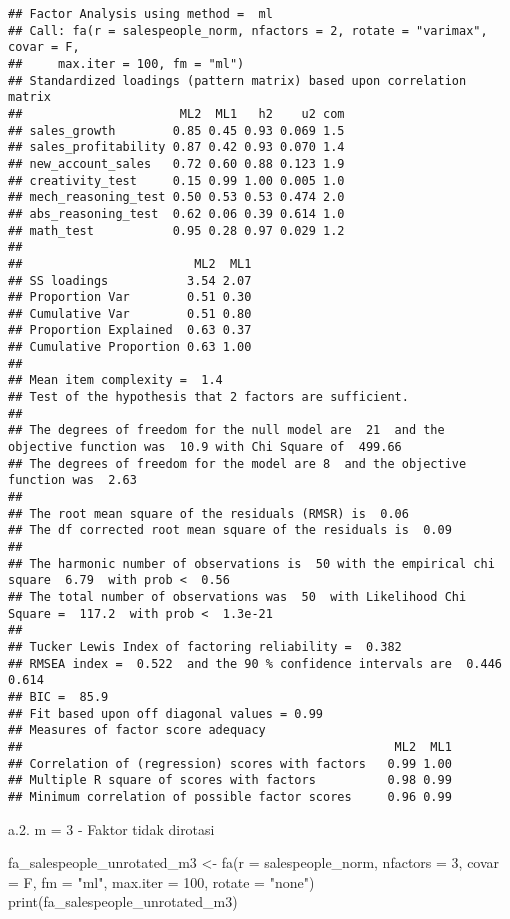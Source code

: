 \documentclass[
]{article}
\newenvironment{Shaded}{\begin{snugshade}}{\end{snugshade}}
\newcommand{\AttributeTok}[1]{\textcolor[rgb]{0.77,0.63,0.00}{#1}}
\newcommand{\DecValTok}[1]{\textcolor[rgb]{0.00,0.00,0.81}{#1}}
\newcommand{\FunctionTok}[1]{\textcolor[rgb]{0.00,0.00,0.00}{#1}}
\newcommand{\NormalTok}[1]{#1}
\newcommand{\OtherTok}[1]{\textcolor[rgb]{0.56,0.35,0.01}{#1}}
\newcommand{\StringTok}[1]{\textcolor[rgb]{0.31,0.60,0.02}{#1}}
\begin{document}
\begin{verbatim}
## Factor Analysis using method =  ml
## Call: fa(r = salespeople_norm, nfactors = 2, rotate = "varimax", covar = F, 
##     max.iter = 100, fm = "ml")
## Standardized loadings (pattern matrix) based upon correlation matrix
##                      ML2  ML1   h2    u2 com
## sales_growth        0.85 0.45 0.93 0.069 1.5
## sales_profitability 0.87 0.42 0.93 0.070 1.4
## new_account_sales   0.72 0.60 0.88 0.123 1.9
## creativity_test     0.15 0.99 1.00 0.005 1.0
## mech_reasoning_test 0.50 0.53 0.53 0.474 2.0
## abs_reasoning_test  0.62 0.06 0.39 0.614 1.0
## math_test           0.95 0.28 0.97 0.029 1.2
## 
##                        ML2  ML1
## SS loadings           3.54 2.07
## Proportion Var        0.51 0.30
## Cumulative Var        0.51 0.80
## Proportion Explained  0.63 0.37
## Cumulative Proportion 0.63 1.00
## 
## Mean item complexity =  1.4
## Test of the hypothesis that 2 factors are sufficient.
## 
## The degrees of freedom for the null model are  21  and the objective function was  10.9 with Chi Square of  499.66
## The degrees of freedom for the model are 8  and the objective function was  2.63 
## 
## The root mean square of the residuals (RMSR) is  0.06 
## The df corrected root mean square of the residuals is  0.09 
## 
## The harmonic number of observations is  50 with the empirical chi square  6.79  with prob <  0.56 
## The total number of observations was  50  with Likelihood Chi Square =  117.2  with prob <  1.3e-21 
## 
## Tucker Lewis Index of factoring reliability =  0.382
## RMSEA index =  0.522  and the 90 % confidence intervals are  0.446 0.614
## BIC =  85.9
## Fit based upon off diagonal values = 0.99
## Measures of factor score adequacy             
##                                                    ML2  ML1
## Correlation of (regression) scores with factors   0.99 1.00
## Multiple R square of scores with factors          0.98 0.99
## Minimum correlation of possible factor scores     0.96 0.99
\end{verbatim}

a.2. m = 3 - Faktor tidak dirotasi

\begin{Shaded}
\begin{Highlighting}[]
\NormalTok{fa\_salespeople\_unrotated\_m3 }\OtherTok{\textless{}{-}} \FunctionTok{fa}\NormalTok{(}\AttributeTok{r =}\NormalTok{ salespeople\_norm, }\AttributeTok{nfactors =} \DecValTok{3}\NormalTok{, }\AttributeTok{covar =}\NormalTok{ F, }\AttributeTok{fm =} \StringTok{"ml"}\NormalTok{, }\AttributeTok{max.iter =} \DecValTok{100}\NormalTok{, }\AttributeTok{rotate =} \StringTok{"none"}\NormalTok{)}
\FunctionTok{print}\NormalTok{(fa\_salespeople\_unrotated\_m3)}
\end{Highlighting}
\end{Shaded}
\end{document}
